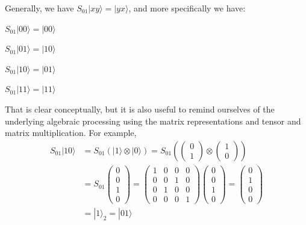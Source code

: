 \documentclass{article}
\begin{document}
Generally, we have $S_{01} |xy\rangle = |yx\rangle$, and more specifically we have:

\vspace{0.125in}

\begin{addmargin}[0.25in]{0.25in}
$S_{01} |00\rangle = |00\rangle$\par
$S_{01} |01\rangle = |10\rangle$\par
$S_{01} |10\rangle = |01\rangle$\par
$S_{01} |11\rangle = |11\rangle$\par
\end{addmargin}

\vspace{0.125in}

That is clear conceptually, but it is also useful to remind ourselves of the underlying algebraic processing using the matrix representations and tensor and matrix multiplication. For example,
\begin{align*}
S_{01} |10\rangle
  &= S_{01} (|1\rangle \otimes |0\rangle)
  = S_{01} (\begin{pmatrix}0\\1\end{pmatrix} \otimes
             \begin{pmatrix}1\\0\end{pmatrix})\\
  &= S_{01} \begin{pmatrix}0\\0\\1\\0\end{pmatrix}
  = \begin{pmatrix} 1 & 0 & 0 & 0\\
                    0 & 0 & 1 & 0\\
                    0 & 1 & 0 & 0\\
                    0 & 0 & 0 & 1\end{pmatrix}
    \begin{pmatrix}0\\0\\1\\0\end{pmatrix}
  = \begin{pmatrix}0\\1\\0\\0\end{pmatrix}\\
  &= |1\rangle_{2} = |01\rangle
\end{align*}
\end{document}
